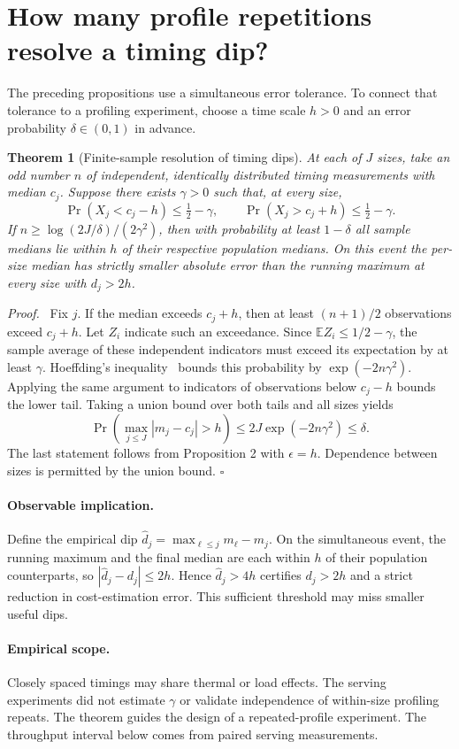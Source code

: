 \documentclass[11pt]{article}
\newtheorem{theorem}[proposition]{Theorem}
\newenvironment{proof}{\par\noindent\textit{Proof.}\ }{\unskip\nobreak\hfill$\square$\par}
\begin{document}
\section{How many profile repetitions resolve a timing dip?}
The preceding propositions use a simultaneous error tolerance. To connect that tolerance to a profiling experiment, choose a time scale $h>0$ and an error probability $\delta\in(0,1)$ in advance.
\begin{theorem}[Finite-sample resolution of timing dips]
At each of $J$ sizes, take an odd number $n$ of independent, identically distributed timing measurements with median $c_j$. Suppose there exists $\gamma>0$ such that, at every size,
\[
 \Pr(X_j<c_j-h)\le\tfrac12-\gamma,\qquad
 \Pr(X_j>c_j+h)\le\tfrac12-\gamma .
\]
If $n\ge\log(2J/\delta)/(2\gamma^2)$, then with probability at least $1-\delta$ all sample medians lie within $h$ of their respective population medians. On this event the per-size median has strictly smaller absolute error than the running maximum at every size with $d_j>2h$.
\end{theorem}
\begin{proof}
Fix $j$. If the median exceeds $c_j+h$, then at least $(n+1)/2$ observations exceed $c_j+h$. Let $Z_i$ indicate such an exceedance. Since $\mathbb E Z_i\le 1/2-\gamma$, the sample average of these independent indicators must exceed its expectation by at least $\gamma$. Hoeffding's inequality~\cite{hoeffding} bounds this probability by $\exp(-2n\gamma^2)$. Applying the same argument to indicators of observations below $c_j-h$ bounds the lower tail. Taking a union bound over both tails and all sizes yields
\[
 \Pr\left(\max_{j\le J}|m_j-c_j|>h\right)
 \le 2J\exp(-2n\gamma^2)\le\delta .
\]
The last statement follows from Proposition 2 with $\epsilon=h$. Dependence between sizes is permitted by the union bound.
\end{proof}
\paragraph{Observable implication.} Define the empirical dip $\widehat d_j=\max_{\ell\le j} m_\ell-m_j$. On the simultaneous event, the running maximum and the final median are each within $h$ of their population counterparts, so $|\widehat d_j-d_j|\le2h$. Hence $\widehat d_j>4h$ certifies $d_j>2h$ and a strict reduction in cost-estimation error. This sufficient threshold may miss smaller useful dips.

\paragraph{Empirical scope.} Closely spaced timings may share thermal or load effects. The serving experiments did not estimate $\gamma$ or validate independence of within-size profiling repeats. The theorem guides the design of a repeated-profile experiment. The throughput interval below comes from paired serving measurements.
\clearpage
\end{document}
